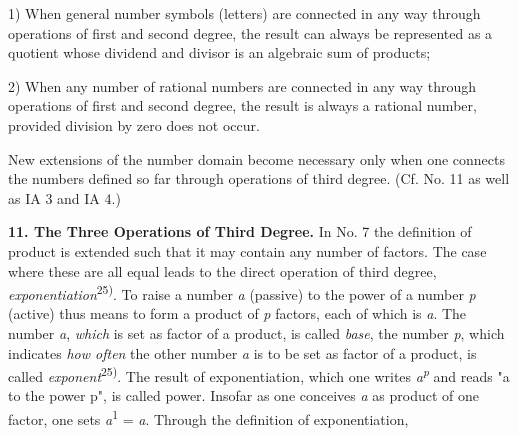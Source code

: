 \thispagestyle{fancy}

\vspace{0.5cm}

1) When general number symbols (letters) are connected in any way through operations of first and second degree, the result can always be represented as a quotient whose dividend and divisor is an algebraic sum of products;

2) When any number of rational numbers are connected in any way through operations of first and second degree, the result is always a rational number, provided division by zero does not occur.

New extensions of the number domain become necessary only when one connects the numbers defined so far through operations of third degree. (Cf. No. 11 as well as IA 3 and IA 4.)

\vspace{0.2cm}

\textbf{11. The Three Operations of Third Degree.} In No. 7 the definition of product is extended such that it may contain any number of factors. The case where these are all equal leads to the direct operation of third degree, \textit{exponentiation}\textsuperscript{25)}. To raise a number \textit{a} (passive) to the power of a number \textit{p} (active) thus means to form a product of \textit{p} factors, each of which is \textit{a}. The number \textit{a}, \textit{which} is set as factor of a product, is called \textit{base}, the number \textit{p}, which indicates \textit{how often} the other number \textit{a} is to be set as factor of a product, is called \textit{exponent}\textsuperscript{25)}. The result of exponentiation, which one writes \textit{a}\textsuperscript{\textit{p}} and reads "a to the power p", is called power. Insofar as one conceives \textit{a} as product of one factor, one sets \textit{a}\textsuperscript{1} = \textit{a}. Through the definition of exponentiation,

